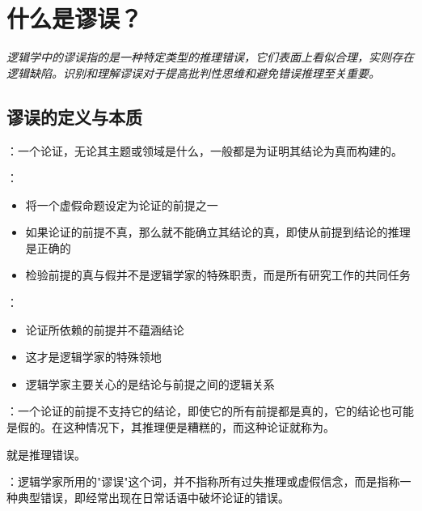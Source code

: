 \section{什么是谬误？}

\begin{logicbox}[title=引言]
\textit{逻辑学中的谬误指的是一种特定类型的推理错误，它们表面上看似合理，实则存在逻辑缺陷。识别和理解谬误对于提高批判性思维和避免错误推理至关重要。}
\end{logicbox}

\subsection{谬误的定义与本质}

\begin{theorembox}[title=论证失败的两种情形]
：一个论证，无论其主题或领域是什么，一般都是为证明其结论为真而构建的。

：
\begin{itemize}
  \item 将一个虚假命题设定为论证的前提之一
  \item 如果论证的前提不真，那么就不能确立其结论的真，即使从前提到结论的推理是正确的
  \item 检验前提的真与假并不是逻辑学家的特殊职责，而是所有研究工作的共同任务
\end{itemize}

：
\begin{itemize}
  \item 论证所依赖的前提并不蕴涵结论
  \item 这才是逻辑学家的特殊领地
  \item 逻辑学家主要关心的是结论与前提之间的逻辑关系
\end{itemize}
\end{theorembox}

\begin{theorembox}[title=谬误的核心定义]
：一个论证的前提不支持它的结论，即使它的所有前提都是真的，它的结论也可能是假的。在这种情况下，其推理便是糟糕的，而这种论证就称为。

就是推理错误。

：逻辑学家所用的"谬误"这个词，并不指称所有过失推理或虚假信念，而是指称一种典型错误，即经常出现在日常话语中破坏论证的错误。
\end{theorembox}

